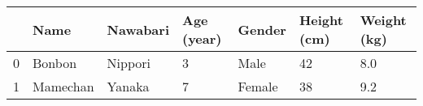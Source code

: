 \begin{tabular}{lllllll}
\toprule
{} &      Name & Nawabari & Age (year) &  Gender & Height (cm) & Weight (kg) \\
\midrule
0 &    Bonbon &  Nippori &          3 &    Male &          42 &         8.0 \\
1 &  Mamechan &   Yanaka &          7 &  Female &          38 &         9.2 \\
\bottomrule
\end{tabular}
